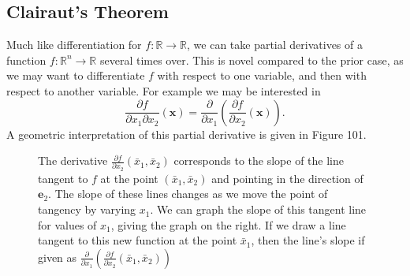 \documentclass{article}
\newcommand{\R}{\mathbb{R}}
\newcommand{\x}{\mathbf{x}}
\theoremstyle{definition}
\begin{document}
\subsection{Clairaut's Theorem}
Much like differentiation for $ f:\R\to\R $, we can take partial derivatives of a function $ f:\R^n\to\R $ several times over. This is novel compared to the prior case, as we may want to differentiate $ f $ with respect to one variable, and then with respect to another variable. For example we may be interested in $$\frac{\partial f}{\partial x_1\partial x_2}(\x) = \frac{\partial }{\partial x_1}\left(\frac{\partial f}{\partial x_2}(\x)\right).$$ A geometric interpretation of this partial derivative is given in Figure 101. 
\begin{figure}
	\centering
\caption{The derivative $ \frac{\partial f}{\partial x_2}(\bar x_1, \bar x_2)  $ corresponds to the slope of the line tangent to $ f $ at the point $ (\bar x_1,\bar x_2) $ and pointing in the direction of $ \mathbf e_2 $. The slope of these lines changes as we move the point of tangency by varying $ x_1 $. We can graph the slope of this tangent line for values of $ x_1 $, giving the graph on the right. If we draw a line tangent to this new function at the point $ \bar x_1 $, then the line's slope if given as $ \frac{\partial }{\partial x_1}\left(\frac{\partial f}{\partial x_2}(\bar x_1,\bar x_2)\right) $}
\end{figure}	
\end{document}
